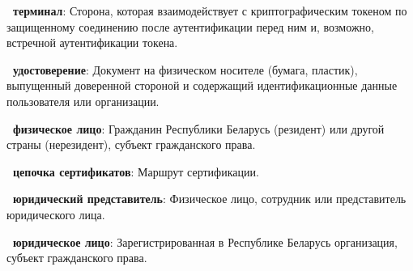 {\bf\thedefctr~терминал}: 
Сторона, которая взаимодействует с криптографическим токеном по 
защищенному соединению после аутентификации перед ним и, возможно, 
встречной аутентификации токена.  

{\bf\thedefctr~удостоверение}: 
Документ на физическом носителе (бумага, пластик), выпущенный доверенной 
стороной и содержащий идентификационные данные пользователя или 
организации.

{\bf\thedefctr~физическое лицо}: 
Гражданин Республики Беларусь (резидент) или другой страны (нерезидент),
субъект гражданского права. 

{\bf\thedefctr~цепочка сертификатов}: 
Маршрут сертификации.

{\bf\thedefctr~юридический представитель}: 
Физическое лицо, сотрудник или представитель юридического лица.

{\bf\thedefctr~юридическое лицо}:
Зарегистрированная в Республике Беларусь организация, 
субъект гражданского права.

